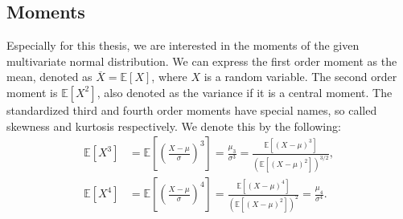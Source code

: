 \subsection{Moments}\label{subsec:moments}

Especially for this thesis, we are interested in the moments of the given multivariate normal distribution.
We can express the first order moment as the mean, denoted as $\overline{X} = \mathbb{E}[X]$, where $X$ is a random variable.
The second order moment is $\mathbb{E}[X^2]$, also denoted as the variance if it is a central moment.
The standardized third and fourth order moments have special names, so called skewness and kurtosis respectively.
We denote this by the following:
\begin{align}
    \mathbb{E}[X^3]
    &= \mathbb{E}\left[\left(\frac{X-\mu}{\sigma}\right)^3\right]
    = \frac{\mu_3}{\sigma^3}
    = \frac{\mathbb{E}[(X-\mu)^3]}{(\mathbb{E}[(X-\mu)^2])^{3/2}}, \\
    \mathbb{E}[X^4]
    &= \mathbb{E}\left[\left(\frac{X-\mu}{\sigma}\right)^4\right]
    = \frac{\mathbb{E}[(X-\mu)^4]}{(\mathbb{E}[(X-\mu)^2])^2}
    = \frac{\mu_4}{\sigma^4}.
\end{align}